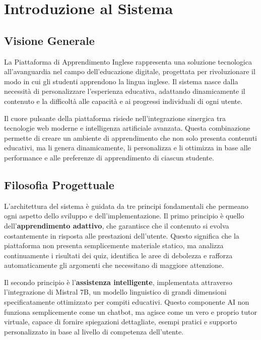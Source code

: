 \documentclass[12pt,a4paper]{article}
\begin{document}
\newpage

\section{Introduzione al Sistema}

\subsection{Visione Generale}

La Piattaforma di Apprendimento Inglese rappresenta una soluzione tecnologica all'avanguardia nel campo dell'educazione digitale, progettata per rivoluzionare il modo in cui gli studenti apprendono la lingua inglese. Il sistema nasce dalla necessità di personalizzare l'esperienza educativa, adattando dinamicamente il contenuto e la difficoltà alle capacità e ai progressi individuali di ogni utente.

Il cuore pulsante della piattaforma risiede nell'integrazione sinergica tra tecnologie web moderne e intelligenza artificiale avanzata. Questa combinazione permette di creare un ambiente di apprendimento che non solo presenta contenuti educativi, ma li genera dinamicamente, li personalizza e li ottimizza in base alle performance e alle preferenze di apprendimento di ciascun studente.

\subsection{Filosofia Progettuale}

L'architettura del sistema è guidata da tre principi fondamentali che permeano ogni aspetto dello sviluppo e dell'implementazione. Il primo principio è quello dell'\textbf{apprendimento adattivo}, che garantisce che il contenuto si evolva costantemente in risposta alle prestazioni dell'utente. Questo significa che la piattaforma non presenta semplicemente materiale statico, ma analizza continuamente i risultati dei quiz, identifica le aree di debolezza e rafforza automaticamente gli argomenti che necessitano di maggiore attenzione.

Il secondo principio è l'\textbf{assistenza intelligente}, implementata attraverso l'integrazione di Mistral 7B, un modello linguistico di grandi dimensioni specificatamente ottimizzato per compiti educativi. Questo componente AI non funziona semplicemente come un chatbot, ma agisce come un vero e proprio tutor virtuale, capace di fornire spiegazioni dettagliate, esempi pratici e supporto personalizzato in base al livello di competenza dell'utente.
\end{document}
